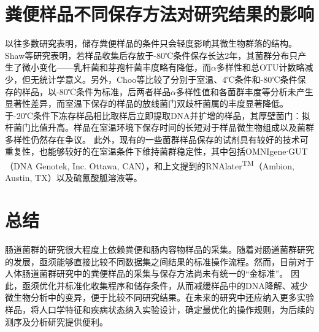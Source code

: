 \section{粪便样品不同保存方法对研究结果的影响}
以往多数研究表明，储存粪便样品的条件只会轻度影响其微生物群落的结构。Shaw等\cite{shaw2016latitude}研究表明，若样品收集后存放于-80℃条件保存长达2年，其菌群分布只产生了微小变化——乳杆菌和芽孢杆菌丰度略有降低，而$\alpha$多样性和总OTU计数略减少，但无统计学意义。另外，Choo等\cite{choo2015sample}比较了分别于室温、4℃条件和-80℃条件保存的样品，以-80℃条件为标准，后两者样品$\alpha$多样性值和各菌群丰度等分析未产生显著性差异，而室温下保存的样品的放线菌门双歧杆菌属的丰度显著降低。于-20℃条件下冻存样品相比取样后立即提取DNA并扩增的样品，其厚壁菌门：拟杆菌门比值升高\cite{bahl2012freezing}。样品在室温环境下保存时间的长短对于样品微生物组成以及菌群多样性仍然存在争议\cite{guo2016effect,nishimoto2016high,carroll2012characterization}。
此外，现有的一些菌群样品保存的试剂具有较好的技术可重复性，也能够较好的在室温条件下维持菌群稳定性，其中包括OMNIgene∙GUT （DNA Genotek, Inc. Ottawa, CAN），和上文提到的RNAlater\textsuperscript{TM}（Ambion, Austin, TX）以及硫氰酸胍溶液\cite{nishimoto2016high}等。
\section{总结}
肠道菌群的研究很大程度上依赖粪便和肠内容物样品的采集。随着对肠道菌群研究的发展，亟须能够直接比较不同数据集之间结果的标准操作流程。然而，目前对于人体肠道菌群研究中的粪便样品的采集与保存方法尚未有统一的“金标准”。
因此，亟须优化并标准化收集程序和储存条件，从而减缓样品中的DNA降解、减少微生物分析中的变异，便于比较不同研究结果。在未来的研究中还应纳入更多实验样品，将人口学特征和疾病状态纳入实验设计，确定最优化的操作规则，为后续的测序及分析研究提供便利。
